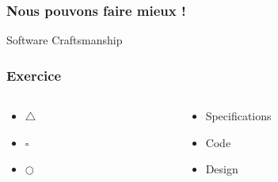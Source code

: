 \documentclass[xcolor={dvipsnames}]{beamer}
\begin{document}
\begin{frame}
    \frametitle{Nous pouvons faire mieux !}
    \begin{center}
        \Huge Software Craftsmanship
    \end{center}
\end{frame}

\begin{frame}
    \frametitle{Exercice}
    \begin{columns}
        \begin{column}{0.5\textwidth}
            \begin{itemize}
                \item<1,7,9 ,12> \Huge $\triangle$ 
                \item<2,7,10,13> \Huge $\square$
                \item<3,7,11,14> \Huge $\bigcirc$
            \end{itemize}
        \end{column}
        \begin{column}{0.5\textwidth}
            \begin{itemize}
                \item<4,8,15,18> \huge Specifications 
                \item<5,8,16,19> \huge Code
                \item<6,8,17,20> \huge Design
            \end{itemize}
        \end{column}
    \end{columns}
\end{frame}
\end{document}
